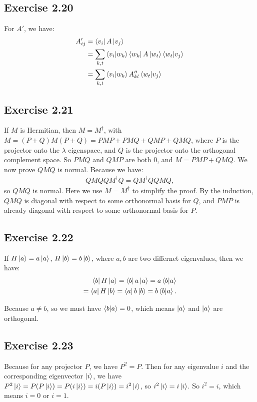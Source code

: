 \subsection*{Exercise 2.20}

For $A'$, we have:
\begin{align}
A_{i j}' &= \bra{v_i}A\ket{v_j}\\
&=\sum_{k,t}\bra{v_i}\ket{w_k}\bra{w_k}A\ket{w_t}\bra{w_t}\ket{v_j}\\
&=\sum_{k,t}\bra{v_i}\ket{w_k}A_{kl}''\bra{w_t}\ket{v_j}
\end{align}

\subsection*{Exercise 2.21}
If $M$ is Hermitian, then $M=M^\dagger$, with $M=(P+Q)M(P+Q)=PMP+PMQ+QMP+QMQ$, where $P$ is the projector onto the $\lambda$ eigenspace, and $Q$ is the projector onto the orthogonal complement space. So $PMQ$ and $QMP$ are both $0$, and $M=PMP+QMQ$. We now prove $QMQ$ is normal. Because we have:
\begin{align}
QMQQM^\dagger Q = QM^\dagger QQMQ,
\end{align}
so $QMQ$ is normal. Here we use $M=M^\dagger$ to simplify the proof. By the induction, $QMQ$ is diagonal with respect to some orthonormal basis for $Q$, and $PMP$ is already diagonal with respect to some orthonormal basis for $P$.

\subsection*{Exercise 2.22}

If $H\ket{a}=a\ket{a}$, $H\ket{b}=b\ket{b}$, where $a,b$ are two differnet eigenvalues, then we have:
\begin{align}
\bra{b}H\ket{a}=\bra{b}a\ket{a}=a\bra{b}\ket{a}\\
=\bra{a}H\ket{b}=\bra{a}b\ket{b}=b\bra{b}\ket{a}.
\end{align}

Because $a\neq b$, so we must have $\bra{b}\ket{a}=0$, which means $\ket{a}$ and $\ket{a}$ are orthogonal.

\subsection*{Exercise 2.23}
Because for any projector $P$, we have $P^2=P$. Then for any eigenvalue $i$ and the corresponding eigenvector $\ket{i}$, we have $P^2\ket{i}=P(P\ket{i})=P(i\ket{i})=i(P\ket{i})=i^2\ket{i}$, so $i^2\ket{i}=i\ket{i}$. So $i^2 = i$, which means $i=0$ or $i=1$.


